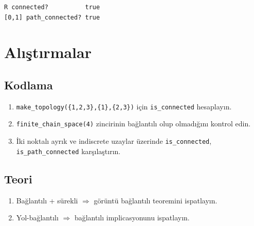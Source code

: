 \begin{verbatim}
R connected?          true
[0,1] path_connected? true
\end{verbatim}

\section{Alıştırmalar}

\subsection*{Kodlama}

\begin{enumerate}[label=K\arabic*.]
\item \texttt{make\_topology(\{1,2,3\},\{1\},\{2,3\})} için \texttt{is\_connected} hesaplayın.
\item \texttt{finite\_chain\_space(4)} zincirinin bağlantılı olup olmadığını kontrol edin.
\item İki noktalı ayrık ve indiscrete uzaylar üzerinde \texttt{is\_connected},
      \texttt{is\_path\_connected} karşılaştırın.
\end{enumerate}

\subsection*{Teori}

\begin{enumerate}[label=T\arabic*.]
\item Bağlantılı + sürekli $\Rightarrow$ görüntü bağlantılı teoremini ispatlayın.
\item Yol-bağlantılı $\Rightarrow$ bağlantılı implicasyonunu ispatlayın.
\end{enumerate}
